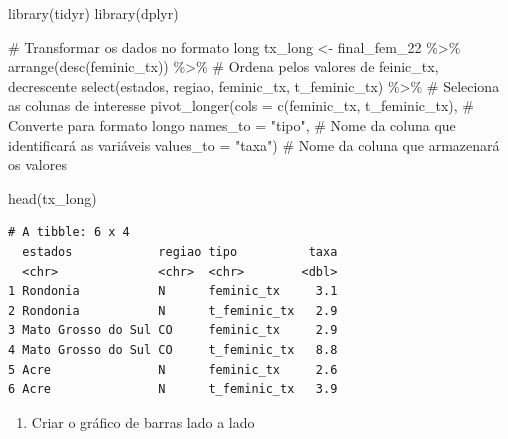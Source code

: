 \documentclass[
  letterpaper,
  DIV=11,
  numbers=noendperiod]{scrreprt}
\newenvironment{Shaded}{\begin{snugshade}}{\end{snugshade}}
\newcommand{\AttributeTok}[1]{\textcolor[rgb]{0.40,0.45,0.13}{#1}}
\newcommand{\CommentTok}[1]{\textcolor[rgb]{0.37,0.37,0.37}{#1}}
\newcommand{\FunctionTok}[1]{\textcolor[rgb]{0.28,0.35,0.67}{#1}}
\newcommand{\NormalTok}[1]{\textcolor[rgb]{0.00,0.23,0.31}{#1}}
\newcommand{\OtherTok}[1]{\textcolor[rgb]{0.00,0.23,0.31}{#1}}
\newcommand{\SpecialCharTok}[1]{\textcolor[rgb]{0.37,0.37,0.37}{#1}}
\newcommand{\StringTok}[1]{\textcolor[rgb]{0.13,0.47,0.30}{#1}}
\providecommand{\tightlist}{%
  \setlength{\itemsep}{0pt}\setlength{\parskip}{0pt}}
\begin{document}
\begin{Shaded}
\begin{Highlighting}[]
\FunctionTok{library}\NormalTok{(tidyr)}
\FunctionTok{library}\NormalTok{(dplyr)}

\CommentTok{\# Transformar os dados no formato long}
\NormalTok{tx\_long }\OtherTok{\textless{}{-}}\NormalTok{ final\_fem\_22 }\SpecialCharTok{\%\textgreater{}\%}
  \FunctionTok{arrange}\NormalTok{(}\FunctionTok{desc}\NormalTok{(feminic\_tx)) }\SpecialCharTok{\%\textgreater{}\%}                          \CommentTok{\# Ordena pelos valores de feinic\_tx, decrescente}
  \FunctionTok{select}\NormalTok{(estados, regiao, feminic\_tx, t\_feminic\_tx) }\SpecialCharTok{\%\textgreater{}\%}  \CommentTok{\# Seleciona as colunas de interesse}
  \FunctionTok{pivot\_longer}\NormalTok{(}\AttributeTok{cols =} \FunctionTok{c}\NormalTok{(feminic\_tx, t\_feminic\_tx),       }\CommentTok{\# Converte para formato longo}
               \AttributeTok{names\_to =} \StringTok{"tipo"}\NormalTok{,                        }\CommentTok{\# Nome da coluna que identificará as variáveis}
               \AttributeTok{values\_to =} \StringTok{"taxa"}\NormalTok{)                       }\CommentTok{\# Nome da coluna que armazenará os valores}

\FunctionTok{head}\NormalTok{(tx\_long)}
\end{Highlighting}
\end{Shaded}

\begin{verbatim}
# A tibble: 6 x 4
  estados            regiao tipo          taxa
  <chr>              <chr>  <chr>        <dbl>
1 Rondonia           N      feminic_tx     3.1
2 Rondonia           N      t_feminic_tx   2.9
3 Mato Grosso do Sul CO     feminic_tx     2.9
4 Mato Grosso do Sul CO     t_feminic_tx   8.8
5 Acre               N      feminic_tx     2.6
6 Acre               N      t_feminic_tx   3.9
\end{verbatim}

\begin{enumerate}
\def\labelenumi{\arabic{enumi}.}
\setcounter{enumi}{1}
\tightlist
\item
  Criar o gráfico de barras lado a lado
\end{enumerate}
\end{document}
